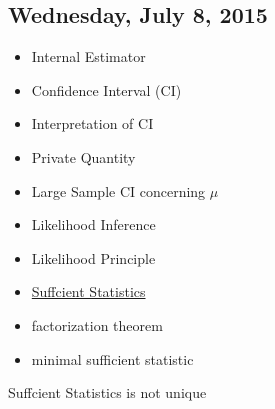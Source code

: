 \subsection{Wednesday, July 8, 2015}

\begin{itemize}
\item Internal Estimator
\item Confidence Interval (CI)
\item Interpretation of CI
\item Private Quantity
\item Large Sample CI concerning $\mu$
\item Likelihood Inference
\item Likelihood Principle
\item \href{https://en.wikipedia.org/wiki/Sufficient_statistic}{Suffcient Statistics}
\item factorization theorem
\item minimal sufficient statistic
\end{itemize}

Suffcient Statistics is not unique
